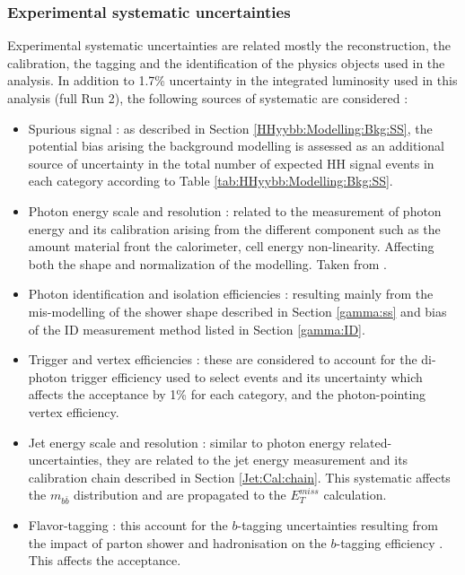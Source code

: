 \subsubsection{Experimental systematic uncertainties}
\label{HHyybb:Syst:Exp}
Experimental systematic uncertainties are related mostly the reconstruction, the calibration, the tagging and the identification of the physics objects used in the analysis. In addition to 1.7\% uncertainty in the integrated luminosity used in this analysis (full Run 2), the following sources of systematic are considered : 
\begin{itemize}
    \item Spurious signal : as described in Section \ref{HHyybb:Modelling:Bkg:SS}, the potential bias arising the background modelling is assessed as an additional source of uncertainty in the total number of expected HH signal events in each category according to Table \ref{tab:HHyybb:Modelling:Bkg:SS}.
    \item Photon energy scale and resolution : related to the measurement of photon energy and its calibration arising from the different component such as the amount material front the calorimeter, cell energy non-linearity. Affecting both the shape and normalization of the modelling. Taken from \cite{PES}.
    \item Photon identification and isolation efficiencies : resulting mainly from the mis-modelling of the shower shape described in Section \ref{gamma:ss} and bias of the ID measurement method listed in Section \ref{gamma:ID}. 
    \item Trigger and vertex efficiencies : these are considered to account for the di-photon trigger efficiency used to select events and its uncertainty which affects the acceptance by 1\% for each category, and the photon-pointing vertex efficiency.
    \item Jet energy scale and resolution : similar to photon energy related-uncertainties, they are related to the jet energy measurement and its calibration chain described in Section \ref{Jet:Cal:chain}. This systematic affects the $m_{b\bar{b}}$ distribution and are propagated to the $E_{T}^{miss}$ calculation. 
    \item Flavor-tagging : this account for the $b$-tagging uncertainties resulting from the impact of parton shower and hadronisation on the $b$-tagging efficiency \cite{IP2}. This affects the acceptance.
\end{itemize}

